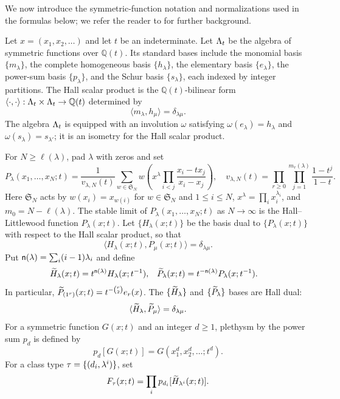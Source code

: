 {We now introduce the symmetric-function notation
and normalizations used in the formulas below; we refer the reader to
\textcite{MacdonaldSymmetric} for further background.}

\begin{definition}
\label{def:symmetric-conventions}
Let $x=(x_1,x_2,\ldots)$ and let $t$ be an indeterminate.
{Let $\Lambda_t$ be the algebra of symmetric functions over $\mathbb Q(t)$.}
{Its standard bases include the monomial basis
$\{m_\lambda\}$, the complete homogeneous basis $\{h_\lambda\}$,
the elementary basis $\{e_\lambda\}$, the power-sum basis
$\{p_\lambda\}$, and the Schur basis $\{s_\lambda\}$, each indexed
by integer partitions.}
{The Hall scalar product is the $\mathbb Q(t)$-bilinear
form $\langle\cdot,\cdot\rangle:\Lambda_t\times\Lambda_t\to\mathbb Q(t)$
determined by}
\begin{equation}
 \langle m_\lambda,h_\mu\rangle=\delta_{\lambda\mu}.
 \label{eq:hall-scalar-product}
\end{equation}
{The algebra $\Lambda_t$ is equipped with an involution
$\omega$ satisfying $\omega(e_\lambda)=h_\lambda$ and
$\omega(s_\lambda)=s_{\lambda'}$; it is an isometry for the Hall scalar product.}

For $N\geq\ell(\lambda)$, pad $\lambda$ with zeros and set
\[
 P_\lambda(x_1,\ldots,x_N;t)=
 \frac{1}{v_{\lambda,N}(t)}\sum_{w\in\mathfrak S_N}
 w\left(x^\lambda\prod_{i<j}\frac{x_i-tx_j}{x_i-x_j}\right),\quad
 v_{\lambda,N}(t)=\prod_{r\geq0}\prod_{j=1}^{m_r(\lambda)}
                    \frac{1-t^j}{1-t}.
\]
Here {$\mathfrak S_N$ acts by $w(x_i)=x_{w(i)}$
for $w\in\mathfrak S_N$ and $1\leq i\leq N$}, $x^\lambda=\prod_i x_i^{\lambda_i}$,
and $m_0=N-\ell(\lambda)$. {The stable limit of
$P_\lambda(x_1,\ldots,x_N;t)$ as $N\to\infty$} is the Hall--Littlewood
function $P_\lambda(x;t)$.
{Let $\{H_\lambda(x;t)\}$ be the basis dual to
$\{P_\lambda(x;t)\}$ with respect to the Hall scalar product, so that
\begin{equation}
 \langle H_\lambda(x;t),P_\mu(x;t)\rangle=\delta_{\lambda\mu}.
 \label{eq:transformed-hall-littlewood}
\end{equation}
Put $\mathsf n(\lambda)=\sum_i(i-1)\lambda_i$ and define}
\begin{align}
 \widetilde H_\lambda(x;t)&=t^{\mathsf n(\lambda)}H_\lambda(x;t^{-1}),&
 \widetilde P_\lambda(x;t)&=t^{-\mathsf n(\lambda)}P_\lambda(x;t^{-1}).
 \label{eq:modified-hall-littlewood}
\end{align}
{In particular,
$\widetilde P_{(1^r)}(x;t)=t^{-\binom r2}e_r(x)$.}
{The $\{\widetilde H_\lambda\}$ and
$\{\widetilde P_\lambda\}$ bases are Hall dual:}
\begin{equation}
 \langle\widetilde H_\lambda,\widetilde P_\mu\rangle=\delta_{\lambda\mu}.
 \label{eq:modified-hall-duality}
\end{equation}
{For a symmetric function $G(x;t)$ and an integer
$d\geq1$, plethysm by the power sum $p_d$ is defined by
\[
 p_d[G(x;t)]=G(x_1^d,x_2^d,\ldots;t^d).
\]
}
For a class type $\tau=\{(d_i,\lambda^i)\}$, set
\begin{equation}
 F_\tau(x;t)=\prod_i p_{d_i}[\widetilde H_{\lambda^i}(x;t)].
 \label{eq:universal-invariant-flag-function}
\end{equation}
\end{definition}

